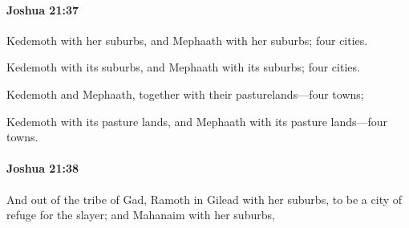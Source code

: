 		\paragraph{Joshua 21:37} %
			\label{JOSHUA-21-37}

			Kedemoth with her suburbs, and Mephaath with her suburbs; four cities.

			\begin{versebox}
					\item[BHS] 
					\item[ASV] Kedemoth with its suburbs, and Mephaath with its suburbs; four cities.
					\item[NIV] Kedemoth and Mephaath, together with their pasturelands—four towns;
					\item[NRSV] Kedemoth with its pasture lands, and Mephaath with its pasture lands—four towns.
			\end{versebox}

		\paragraph{Joshua 21:38} %
			\label{JOSHUA-21-38}

			And out of the tribe of Gad, Ramoth in Gilead with her suburbs, to be a city of refuge for the slayer; and Mahanaim with her suburbs,

